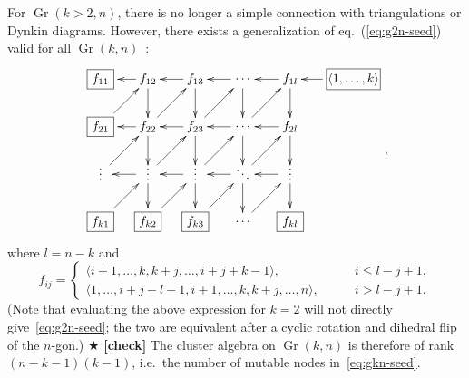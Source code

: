 \documentclass[12pt]{article}
\DeclareMathOperator{\Gr}{Gr}
\def\ket#1{\langle #1 \rangle}
\def\draftnote#1{{\color{red} $\bigstar$ }{\bf [#1]}}
\begin{document}
For $\Gr(k>2,n)$, there is no longer a simple connection with triangulations or Dynkin diagrams. However, there exists a generalization of eq.~(\ref{eq:g2n-seed}) valid for all $\Gr(k,n)$~\cite{1088.22009}:
\begin{equation}\label{eq:gkn-seed}
\begin{gathered}
\begin{xy} 0;<-.5pt,0pt>:<0pt,-.5pt>::
	(-100,0) *+{\framebox[10ex]{$\ket{1,\ldots,k}$}} ="-1",
	(0,0) *+{f_{1l}} ="0",
	(75,0) *+{\color{white} f_{00}} ="1",
	(150,0) *+{f_{13}} ="2",
	(225,0) *+{f_{12}} ="3",
	(300,0) *+{\framebox[5ex]{$f_{11}$}} ="4",
	(0,75) *+{f_{2l}} ="5",
	(75,75) *+{\color{white} f_{00}} ="6",
	(150,75) *+{f_{23}} ="7",
	(225,75) *+{f_{22}} ="8",
	(300,75) *+{\framebox[5ex]{$f_{21}$}} ="9",
	(0,150) *+{\color{white} f_{00}} ="10",
	(75,150) *+{\color{white} f_{00}} ="11",
	(150,150) *+{\color{white} f_{00}} ="12",
	(225,150) *+{\color{white} f_{00}} ="13",
	(300,150) *+{\color{white} f_{00}} ="14",
	(0,225) *+{\framebox[5ex]{$f_{kl}$}} ="15",
	(75,225) *+{\color{white} f_{00}} ="16",
	(150,225) *+{\framebox[5ex]{$f_{k3}$}} ="17",
	(225,225) *+{\framebox[5ex]{$f_{k2}$}} ="18",
	(300,225) *+{\framebox[5ex]{$f_{k1}$}} ="19",
	(75,0) *+{\cdots} ="01",
	(75,75) *+{\cdots} ="06",
	(0,144) *+{\vdots} ="010",
	(75,144) *+{\ddots} ="011",
	(150,144) *+{\vdots} ="012",
	(225,144) *+{\vdots} ="013",
	(300,144) *+{\vdots} ="014",
	(75,225) *+{\cdots} ="016",
	"-1", {\ar"0"},
	"0", {\ar"1"},
	"0", {\ar"5"},
	"6", {\ar"0"},
	"1", {\ar"2"},
	"2", {\ar"3"},
	"2", {\ar"7"},
	"8", {\ar"2"},
	"3", {\ar"4"},
	"3", {\ar"8"},
	"9", {\ar"3"},
	"5", {\ar"6"},
	"6", {\ar"7"},
	"7", {\ar"8"},
	"8", {\ar"9"},
	"13", {\ar"7"},
	"7", {\ar"12"},
	"8", {\ar"13"},
	"5", {\ar"10"},
	"14", {\ar"8"},
	"10", {\ar"15"},
	"12", {\ar"17"},
	"19", {\ar"13"},
	"18", {\ar"12"},
	"13", {\ar"18"},
	"17", {\ar"11"},
	"16", {\ar"10"},
	"13", {\ar"14"},
	"12", {\ar"13"},
	"11", {\ar"12"},
	"10", {\ar"11"},
	"7", {\ar"1"},
	"11", {\ar"5"},
	"12", {\ar"6"},
	"1", {\ar"6"},
	"6", {\ar"11"},
	"11", {\ar"16"},
\end{xy}
\end{gathered} ,
\end{equation}
where $l=n-k$ and 
\begin{equation}
  f_{i j} =
  \begin{cases}
    \langle i+1, \dotsc, k, k+j, \dotsc, i+j+k-1\rangle, \qquad &i \leq l-j+1,\\
    \langle 1, \dotsc, i+j-l-1, i+1, \dotsc, k, k+j, \dotsc, n\rangle, \qquad &i >l-j+1.
  \end{cases}
\end{equation}
(Note that evaluating the above expression for $k=2$ will not directly give~\eqref{eq:g2n-seed}; the two are equivalent after a cyclic rotation and dihedral flip of the $n$-gon.)\draftnote{check} The cluster algebra on $\Gr(k,n)$ is therefore of rank $(n-k-1)(k-1)$, i.e.~the number of mutable nodes in~\eqref{eq:gkn-seed}. 
\end{document}
